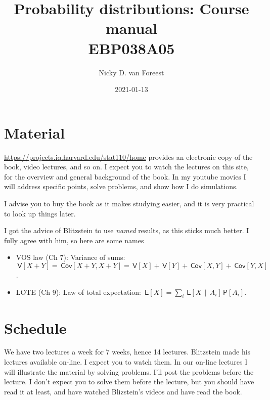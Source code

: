 \documentclass[a4paper]{article}
\author{Nicky D. van Foreest}
\date{2021-01-13}
\title{Probability distributions: Course manual\\\medskip
\large EBP038A05}
\theoremstyle{definition}
\newcommand{\given}{\,\middle|\,}
\renewcommand{\P}[1]{\,\mathsf{P}\left[#1\right]}
\newcommand{\E}[1]{\,\mathsf{E}\left[#1\right]}
\newcommand{\V}[1]{\,\mathsf{V}\left[#1\right]}
\newcommand{\cov}[1]{\,\mathsf{Cov}\left[#1\right]}
\newcommand{\1}[1]{\,I_{#1}} %
\begin{document}
\maketitle
\tableofcontents


\section{Material}
\label{sec:org975c099}

\url{https://projects.iq.harvard.edu/stat110/home} provides an electronic copy of the book, video lectures, and so on.  I expect you to watch the lectures on this site, for the overview and general background of the book. In my youtube movies I will address specific points, solve problems, and show how I do simulations. 

I advise you to buy the book as it makes studying easier, and it is very practical to look up things later.

I got the advice of  Blitzstein to use \emph{named} results, as this sticks much better. I fully agree with him, so here are some names 
\begin{itemize}
\item VOS law (Ch 7): Variance of sums: \(\V{X+Y}= \cov{X+Y, X+Y} = \V X + \V Y + \cov{X,Y} + \cov{Y, X}\).
\item LOTE  (Ch 9):  Law of total expectation: \(\E{X} = \sum_{i} \E{X \given A_i} \P{A_i}\).
\end{itemize}


\section{Schedule}
\label{sec:orgdb5efee}

We have two lectures a week for 7 weeks, hence 14 lectures.
Blitzstein made his lectures available on-line.
I expect you to watch them.
In our on-line lectures I will illustrate the material by solving problems.
I'll post the problems before the lecture.
I don't expect you to solve them before the lecture, but you should have read it at least, and have watched Blizstein's videos and have read the book.
\end{document}

